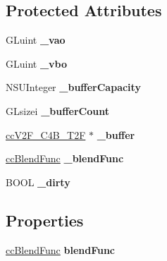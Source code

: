 \subsection*{Protected Attributes}
\begin{DoxyCompactItemize}
\item 
\hypertarget{interface_c_c_draw_node_a327973d0c6f49be4246332ce4838fde4}{G\-Luint {\bfseries \-\_\-vao}}\label{interface_c_c_draw_node_a327973d0c6f49be4246332ce4838fde4}

\item 
\hypertarget{interface_c_c_draw_node_ad3a07f674aa28a6f0f9e94e59bfc92be}{G\-Luint {\bfseries \-\_\-vbo}}\label{interface_c_c_draw_node_ad3a07f674aa28a6f0f9e94e59bfc92be}

\item 
\hypertarget{interface_c_c_draw_node_a0fe851252a8e3a415f7b7804d5baa8f2}{N\-S\-U\-Integer {\bfseries \-\_\-buffer\-Capacity}}\label{interface_c_c_draw_node_a0fe851252a8e3a415f7b7804d5baa8f2}

\item 
\hypertarget{interface_c_c_draw_node_acb998d98562096e913493ad33a049e45}{G\-Lsizei {\bfseries \-\_\-buffer\-Count}}\label{interface_c_c_draw_node_acb998d98562096e913493ad33a049e45}

\item 
\hypertarget{interface_c_c_draw_node_a3fea8e8822a14583c8c6981278adeda1}{\hyperlink{cc_types_8h_aa3f3456208d3090768d2c9bff64412ac}{cc\-V2\-F\-\_\-\-C4\-B\-\_\-\-T2\-F} $\ast$ {\bfseries \-\_\-buffer}}\label{interface_c_c_draw_node_a3fea8e8822a14583c8c6981278adeda1}

\item 
\hypertarget{interface_c_c_draw_node_a6b3b2d749e576d368fd2b0395cc1ea9d}{\hyperlink{cc_types_8h_a8c19c6f67219ecc0a6e4740cc046008d}{cc\-Blend\-Func} {\bfseries \-\_\-blend\-Func}}\label{interface_c_c_draw_node_a6b3b2d749e576d368fd2b0395cc1ea9d}

\item 
\hypertarget{interface_c_c_draw_node_acf85a37de16cd029e9cb85f62121f264}{B\-O\-O\-L {\bfseries \-\_\-dirty}}\label{interface_c_c_draw_node_acf85a37de16cd029e9cb85f62121f264}

\end{DoxyCompactItemize}
\subsection*{Properties}
\begin{DoxyCompactItemize}
\item 
\hypertarget{interface_c_c_draw_node_add03e9a03b0ced3213c003ef8c8bc44d}{\hyperlink{cc_types_8h_a8c19c6f67219ecc0a6e4740cc046008d}{cc\-Blend\-Func} {\bfseries blend\-Func}}\label{interface_c_c_draw_node_add03e9a03b0ced3213c003ef8c8bc44d}

\end{DoxyCompactItemize}



